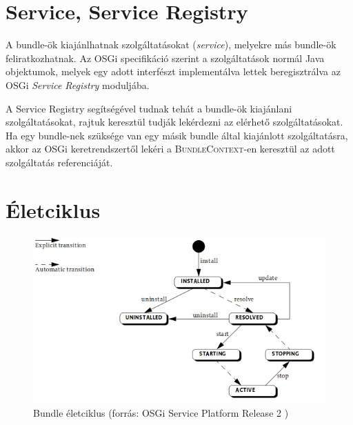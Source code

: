 \section{Service, Service Registry}
\label{sec:service}

A bundle-ök kiajánlhatnak szolgáltatásokat (\textit{service}), melyekre más bundle-ök feliratkozhatnak. Az OSGi specifikáció szerint a szolgáltatások normál Java objektumok, melyek egy adott interfészt implementálva lettek beregisztrálva az OSGi \textit{Service Registry} moduljába.

A Service Registry segítségével tudnak tehát a bundle-ök kiajánlani szolgáltatásokat, rajtuk keresztül tudják lekérdezni az elérhető szolgáltatásokat. Ha egy bundle-nek szüksége van egy másik bundle által kiajánlott szolgáltatásra, akkor az OSGi keretrendszertől lekéri a \textsc{BundleContext}-en keresztül az adott szolgáltatás referenciáját.


\section{Életciklus}
\label{sec:lifecycle}

\begin{figure}[htb]
\centering
\includegraphics[scale=0.5]{img/bundle_lifecycle}
\caption{Bundle életciklus (forrás: OSGi Service Platform Release 2 \cite{osgi})}
\label{fig:bundle_lifecycle}
\end{figure}

